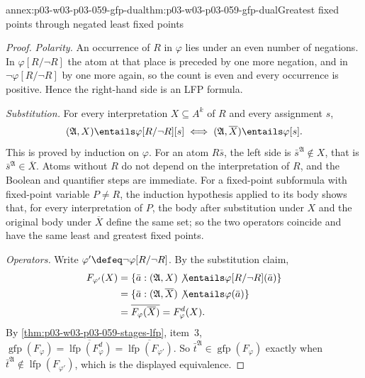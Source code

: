 \begin{annexitem}{annex:p03-w03-p03-059-gfp-dual}{thm:p03-w03-p03-059-gfp-dual}{Greatest fixed points through negated least fixed points}
\begin{proof}
\emph{Polarity.} An occurrence of \(R\) in \(\varphi\) lies under an even
number of negations. In \(\varphi[R/\neg R]\) the atom at that place is
preceded by one more negation, and in \(\neg\varphi[R/\neg R]\) by one more
again, so the count is even and every occurrence is positive. Hence the
right-hand side is an LFP formula.

\emph{Substitution.} For every interpretation \(X\subseteq A^k\) of \(R\)
and every assignment \(s\),
\[
 (\mathfrak A,X)\entails\varphi[R/\neg R][s]
 \iff
 (\mathfrak A,\overline X)\entails\varphi[s].
\]
This is proved by induction on \(\varphi\). For an atom \(R\bar s\), the
left side is \(\bar s^{\mathfrak A}\notin X\), that is
\(\bar s^{\mathfrak A}\in\overline X\). Atoms without \(R\) do not depend on
the interpretation of \(R\), and the Boolean and quantifier steps are
immediate. For a fixed-point subformula with fixed-point variable
\(P\neq R\), the induction hypothesis applied to its body shows that, for
every interpretation of \(P\), the body after substitution under \(X\) and
the original body under \(\overline X\) define the same set; so the two
operators coincide and have the same least and greatest fixed points.

\emph{Operators.} Write \(\varphi'\defeq\neg\varphi[R/\neg R]\). By the
substitution claim,
\[
\begin{aligned}
 F_{\varphi'}(X)&=\{\bar a:(\mathfrak A,X)\not\entails
   \varphi[R/\neg R](\bar a)\}\\
 &=\{\bar a:(\mathfrak A,\overline X)\not\entails\varphi(\bar a)\}\\
 &=\overline{F_\varphi(\overline X)}=F_\varphi^d(X).
\end{aligned}
\]
By \cref{thm:p03-w03-p03-059-stages-lfp}, item~3,
\(\operatorname{gfp}(F_\varphi)=\overline{\operatorname{lfp}(F_\varphi^d)}
=\overline{\operatorname{lfp}(F_{\varphi'})}\). So
\(\bar t^{\mathfrak A}\in\operatorname{gfp}(F_\varphi)\) exactly when
\(\bar t^{\mathfrak A}\notin\operatorname{lfp}(F_{\varphi'})\), which is the
displayed equivalence.
\end{proof}
\end{annexitem}

